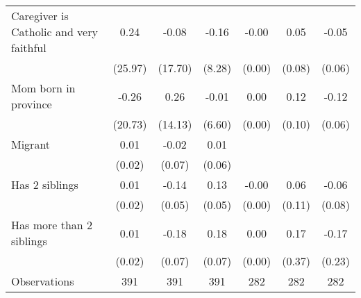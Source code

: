 {\begin{tabular}{l*{6}{c}}
\addlinespace
Caregiver is Catholic and very faithful&        0.24         &       -0.08         &       -0.16         &       -0.00         &        0.05         &       -0.05         \\
                    &     (25.97)         &     (17.70)         &      (8.28)         &      (0.00)         &      (0.08)         &      (0.06)         \\
\addlinespace
Mom born in province&       -0.26         &        0.26         &       -0.01         &        0.00         &        0.12         &       -0.12         \\
                    &     (20.73)         &     (14.13)         &      (6.60)         &      (0.00)         &      (0.10)         &      (0.06)         \\
\addlinespace
Migrant         &        0.01         &       -0.02         &        0.01         &                     &                     &                     \\
                    &      (0.02)         &      (0.07)         &      (0.06)         &                     &                     &                     \\
\addlinespace
Has 2 siblings      &        0.01         &       -0.14\sym{**} &        0.13\sym{*}  &       -0.00         &        0.06         &       -0.06         \\
                    &      (0.02)         &      (0.05)         &      (0.05)         &      (0.00)         &      (0.11)         &      (0.08)         \\
\addlinespace
Has more than 2 siblings&        0.01         &       -0.18\sym{*}  &        0.18\sym{*}  &        0.00         &        0.17         &       -0.17         \\
                    &      (0.02)         &      (0.07)         &      (0.07)         &      (0.00)         &      (0.37)         &      (0.23)         \\
\midrule
Observations        &         391         &         391         &         391         &         282         &         282         &         282         \\
\bottomrule
\end{tabular}
}
